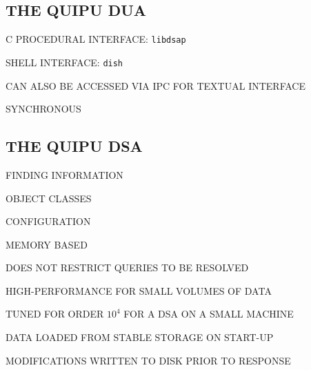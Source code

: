\begin{bwslide}
\part*	{THE QUIPU DUA}\bf

\begin{nrtc}
\item	C PROCEDURAL INTERFACE: \verb"libdsap"

\item	SHELL INTERFACE: \verb"dish"
    \begin{nrtc}
    \item	CAN ALSO BE ACCESSED VIA IPC FOR TEXTUAL INTERFACE
    \end{nrtc}

\item	SYNCHRONOUS
\end{nrtc}
\end{bwslide}




\begin{bwslide}
\part	{THE QUIPU DSA}\bf

\begin{nrtc}
\item	FINDING INFORMATION

\item	OBJECT CLASSES

\item	CONFIGURATION
\end{nrtc}
\end{bwslide}


\begin{bwslide}

\begin{nrtc}
\item	MEMORY BASED
    \begin{nrtc}
    \item	DOES NOT RESTRICT QUERIES TO BE RESOLVED

    \item	HIGH-PERFORMANCE FOR SMALL VOLUMES OF DATA

    \item	TUNED FOR ORDER $10^4$ FOR A DSA ON A SMALL MACHINE
    \end{nrtc}

\item	DATA LOADED FROM STABLE STORAGE ON START-UP

\item	MODIFICATIONS WRITTEN TO DISK PRIOR TO RESPONSE
\end{nrtc}
\end{bwslide}


